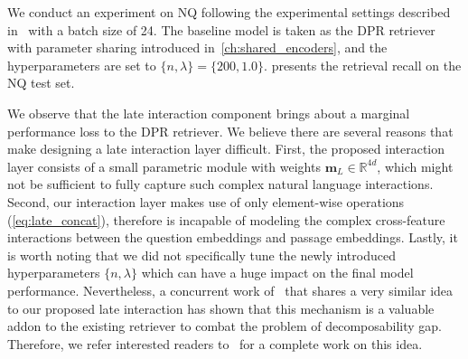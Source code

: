 %
We conduct an experiment on NQ following the experimental settings described in~ with a batch size of 24.
%
The baseline model is taken as the DPR retriever with parameter sharing introduced in~\cref{ch:shared_encoders}, and the hyperparameters are set to $\{n, \lambda\} = \{200, 1.0\}$.
%
 presents the retrieval recall on the NQ test set.

%
We observe that the late interaction component brings about a marginal performance loss to the DPR retriever.
%
We believe there are several reasons that make designing a late interaction layer difficult.
%
First, the proposed interaction layer consists of a small parametric module with weights $\mathbf{m}_L \in \mathbb{R}^{4d}$, which might not be sufficient to fully capture such complex natural language interactions.
%
Second, our interaction layer makes use of only element-wise operations (\eqref{eq:late_concat}), therefore is incapable of modeling the complex cross-feature interactions between the question embeddings and passage embeddings.
%
Lastly, it is worth noting that we did not specifically tune the newly introduced hyperparameters $\{n, \lambda\}$ which can have a huge impact on the final model performance.
%
Nevertheless, a concurrent work of~\citet{khattab2020colbert} that shares a very similar idea to our proposed late interaction has shown that this mechanism is a valuable addon to the existing retriever to combat the problem of decomposability gap.
%
Therefore, we refer interested readers to~\cite{khattab2020colbert} for a complete work on this idea.

